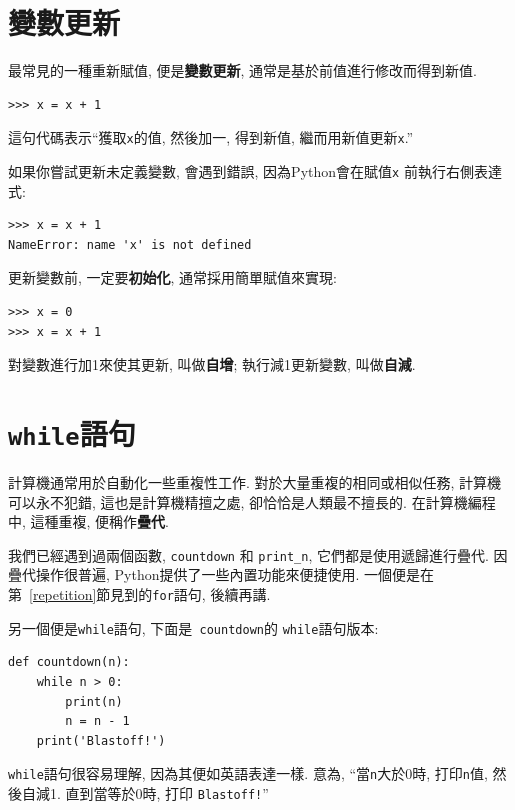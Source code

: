 \documentclass[10pt]{book}
\begin{document}
\section{變數更新}
\label{update}


最常見的一種重新賦值, 便是{\bf 變數更新},
通常是基於前值進行修改而得到新值. 

\begin{verbatim}
>>> x = x + 1
\end{verbatim}
%
這句代碼表示``獲取{\tt x}的值, 然後加一, 得到新值, 繼而用新值更新{\tt x}.'' 

如果你嘗試更新未定義變數, 會遇到錯誤, 
因為Python會在賦值{\tt x} 前執行右側表達式:

\begin{verbatim}
>>> x = x + 1
NameError: name 'x' is not defined
\end{verbatim}
%
更新變數前, 一定要{\bf 初始化}, 通常採用簡單賦值來實現:

\begin{verbatim}
>>> x = 0
>>> x = x + 1
\end{verbatim}
%
對變數進行加1來使其更新, 叫做{\bf 自增};
執行減1更新變數, 叫做{\bf 自減}. 


\section{{\tt while}語句}
計算機通常用於自動化一些重複性工作. 
對於大量重複的相同或相似任務, 計算機可以永不犯錯, 
這也是計算機精擅之處, 卻恰恰是人類最不擅長的. 
在計算機編程中, 這種重複, 便稱作{\bf 疊代}.

我們已經遇到過兩個函數,  {\tt countdown} 和
\verb"print_n",  它們都是使用遞歸進行疊代. 
因疊代操作很普遍, Python提供了一些內置功能來便捷使用. 
一個便是在第~\ref{repetition}節見到的{\tt for}語句, 後續再講. 

另一個便是{\tt while}語句, 下面是{\tt
countdown}的 {\tt while}語句版本:

\begin{verbatim}
def countdown(n):
    while n > 0:
        print(n)
        n = n - 1
    print('Blastoff!')
\end{verbatim}
%
{\tt while}語句很容易理解, 因為其便如英語表達一樣. 
意為, ``當{\tt n}大於0時, 打印{\tt n}值, 然後自減1.
直到當等於0時, 打印 {\tt Blastoff!}''
\end{document}
